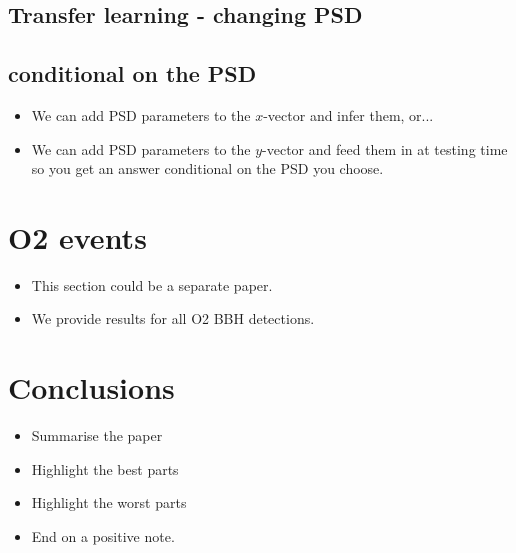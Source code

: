 \documentclass[%
showpacs,
 amsmath,amssymb,
 aps,
 twocolumn,
 prl,
 reprint,
floatfix,
]{revtex4-1}
\begin{document}
\subsection{Transfer learning - changing PSD}

\subsection{conditional on the PSD}

\begin{itemize}
\item We can add PSD parameters to the $x$-vector and infer them, or...
\item We can add PSD parameters to the $y$-vector and feed them in at testing
time so you get an answer conditional on the PSD you choose.
\end{itemize}

\section{O2 events}

\begin{itemize}
\item This section could be a separate paper.
\item We provide results for all O2 BBH detections.
\end{itemize}

\section{Conclusions}

\begin{itemize}
\item Summarise the paper
\item Highlight the best parts
\item Highlight the worst parts
\item End on a positive note.
\end{itemize}


\end{document}

